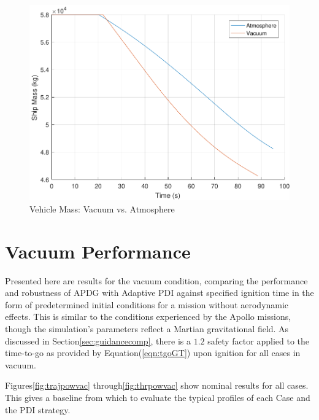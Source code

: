 \begin{figure}[H]
	\centering
	\begin{minipage}{4.3 in}
		\includegraphics[width=\linewidth]{Figures/massatmovsvac.pdf}
		\caption{Vehicle Mass: Vacuum vs. Atmosphere \label{fig:massatmovsvac} }
	\end{minipage}
\end{figure}



\section{Vacuum Performance} \label{sec:vacperf}

Presented here are results for the vacuum condition, comparing the performance and robustness of APDG with Adaptive PDI against specified ignition time in the form of predetermined initial conditions for a mission without aerodynamic effects. This is similar to the conditions experienced by the Apollo missions, though the simulation's parameters reflect a Martian gravitational field. As discussed in Section\:\ref{sec:guidancecomp}, there is a $1.2$ safety factor applied to the time-to-go as provided by Equation\:(\ref{eqn:tgoGT}) upon ignition for all cases in vacuum.

Figures\:\ref{fig:trajpowvac} through\:\ref{fig:thrpowvac} show nominal results for all cases. This gives a baseline from which to evaluate the typical profiles of each Case and the PDI strategy. 

